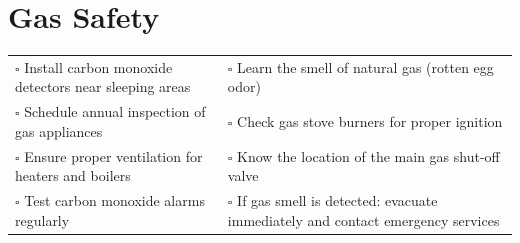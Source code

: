 
\section{Gas Safety}
\label{sec:gas}

\begin{tabular}{p{9cm} p{8cm}}
$\square$ Install carbon monoxide detectors near sleeping areas & $\square$ Learn the smell of natural gas (rotten egg odor) \\ 
$\square$ Schedule annual inspection of gas appliances & $\square$ Check gas stove burners for proper ignition \\ 
$\square$ Ensure proper ventilation for heaters and boilers & $\square$ Know the location of the main gas shut-off valve \\ 
$\square$ Test carbon monoxide alarms regularly & $\square$ If gas smell is detected: evacuate immediately and contact emergency services \\ 
\end{tabular}


